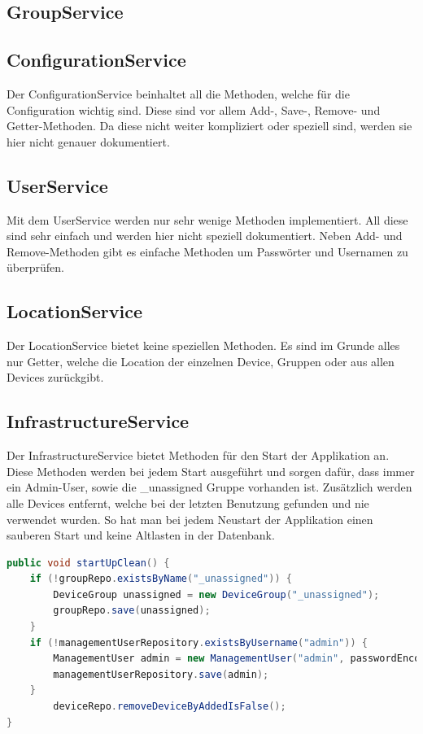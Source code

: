 \subsection{GroupService}

\subsection{ConfigurationService}
Der ConfigurationService beinhaltet all die Methoden, welche für die Configuration wichtig sind. Diese sind vor allem Add-, Save-, Remove- und Getter-Methoden. Da diese nicht weiter kompliziert oder speziell sind, werden sie hier nicht genauer dokumentiert.
\subsection{UserService}
Mit dem UserService werden nur sehr wenige Methoden implementiert. All diese sind sehr einfach und werden hier nicht speziell dokumentiert. Neben Add- und Remove-Methoden gibt es einfache Methoden um Passwörter und Usernamen zu überprüfen.
\subsection{LocationService}
Der LocationService bietet keine speziellen Methoden. Es sind im Grunde alles nur Getter, welche die Location der einzelnen Device, Gruppen oder aus allen Devices zurückgibt.
\subsection{InfrastructureService}
Der InfrastructureService bietet Methoden für den Start der Applikation an. Diese Methoden werden bei jedem Start ausgeführt und sorgen dafür, dass immer ein Admin-User, sowie die \_unassigned Gruppe vorhanden ist. Zusätzlich werden alle Devices entfernt, welche bei der letzten Benutzung gefunden und nie verwendet wurden. So hat man bei jedem Neustart der Applikation einen sauberen Start und keine Altlasten in der Datenbank.
\begin{lstlisting}[language=java]
public void startUpClean() {
	if (!groupRepo.existsByName("_unassigned")) {
		DeviceGroup unassigned = new DeviceGroup("_unassigned");
		groupRepo.save(unassigned);
	}
	if (!managementUserRepository.existsByUsername("admin")) {
		ManagementUser admin = new ManagementUser("admin", passwordEncoder.encode("adminadmin"));
		managementUserRepository.save(admin);
	}
		deviceRepo.removeDeviceByAddedIsFalse();
}
\end{lstlisting}


